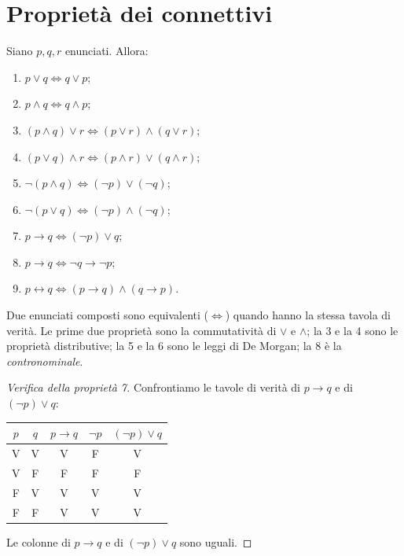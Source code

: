 \documentclass[11pt,a4paper]{article}
\newcommand{\V}{\textsf{V}}
\newcommand{\F}{\textsf{F}}
\begin{document}
\section{Proprietà dei connettivi}

\begin{proposizione}
Siano $p, q, r$ enunciati. Allora:
\begin{enumerate}
    \item $p \lor q \iff q \lor p$;
    \item $p \land q \iff q \land p$;
    \item $(p \land q) \lor r \iff (p \lor r) \land (q \lor r)$;
    \item $(p \lor q) \land r \iff (p \land r) \lor (q \land r)$;
    \item $\neg(p \land q) \iff (\neg p) \lor (\neg q)$;
    \item $\neg(p \lor q) \iff (\neg p) \land (\neg q)$;
    \item $p \to q \iff (\neg p) \lor q$;
    \item $p \to q \iff \neg q \to \neg p$;
    \item $p \leftrightarrow q \iff (p \to q) \land (q \to p)$.
\end{enumerate}
\end{proposizione}

Due enunciati composti sono equivalenti ($\iff$) quando hanno la stessa
tavola di verità. Le prime due proprietà sono la commutatività di $\lor$ e
$\land$; la 3 e la 4 sono le proprietà distributive; la 5 e la 6 sono le
leggi di De Morgan; la 8 è la \emph{contronominale}.

\begin{proof}[Verifica della proprietà 7]
Confrontiamo le tavole di verità di $p \to q$ e di $(\neg p) \lor q$:
\begin{center}
\begin{tabular}{cc|c|c|c}
$p$ & $q$ & $p \to q$ & $\neg p$ & $(\neg p) \lor q$ \\ \hline
\V & \V & \V & \F & \V \\
\V & \F & \F & \F & \F \\
\F & \V & \V & \V & \V \\
\F & \F & \V & \V & \V
\end{tabular}
\end{center}
Le colonne di $p \to q$ e di $(\neg p) \lor q$ sono uguali.
\end{proof}
\end{document}
